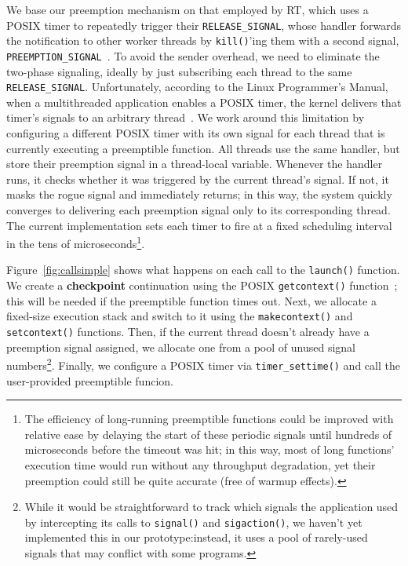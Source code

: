 We base our preemption mechanism on that employed by RT, which uses a POSIX timer to
repeatedly trigger their \texttt{RELEASE\_SIGNAL}, whose handler forwards the
notification to other worker threads by \texttt{kill()}'ing them with a second
signal, \texttt{PREEMPTION\_SIGNAL}~\cite{mollison:rtas2013}.  To avoid the sender
overhead, we need to eliminate the two-phase signaling, ideally by just subscribing
each thread to the same \texttt{RELEASE\_SIGNAL}.  Unfortunately, according to the
Linux Programmer's Manual, when a multithreaded application enables a POSIX timer,
the kernel delivers that timer's signals to an arbitrary
thread~\cite{signal-manpage}.
We work around this limitation by
configuring a different POSIX timer with its own signal for each thread that is
currently executing a preemptible function.  All threads use the same handler, but
store their preemption signal in a thread-local variable.  Whenever the handler runs,
it checks whether it was triggered by the current thread's signal.  If not, it masks
the rogue signal and immediately returns; in this way, the system quickly converges
to delivering each preemption signal only to its corresponding thread.  The current
implementation sets each timer to fire at a fixed scheduling interval in the tens of
microseconds\footnote{The efficiency of long-running preemptible functions could be
improved with relative ease by delaying the start of these periodic signals until
hundreds of microseconds before the timeout was hit; in this way, most of long
functions' execution time would run without any throughput degradation, yet their
preemption could still be quite accurate (free of warmup effects).}.

Figure~\ref{fig:callsimple} shows what happens on each call to the \texttt{launch()}
function.  We create a \textbf{checkpoint} continuation using the POSIX
\texttt{getcontext()} function~\cite{getcontext-manpage}; this will be needed if the
preemptible
function times out.  Next, we allocate a fixed-size execution stack and switch to it
using the \texttt{makecontext()} and \texttt{setcontext()} functions.  Then, if the
current thread doesn't already have a preemption signal assigned, we allocate one
from a pool of unused signal numbers\footnote{While it would be straightforward to
track which signals the application used by intercepting its calls to
\texttt{signal()} and \texttt{sigaction()}, we haven't yet implemented this in our
prototype:\@ instead, it uses a pool of rarely-used signals that may conflict with
some programs.}.  Finally, we configure a POSIX timer via
\texttt{timer\_settime()} and call the user-provided preemptible funcion.

